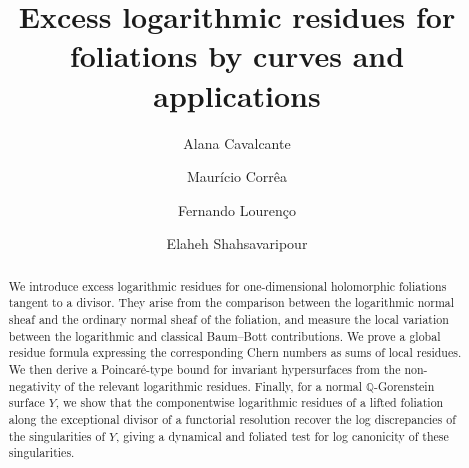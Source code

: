 \documentclass[12pt,reqno,a4paper]{amsart}
\date{}
\numberwithin{equation}{section}
\theoremstyle{plain}
\theoremstyle{definition}
\begin{document}
\title{Excess logarithmic residues for foliations by curves and applications}

\author[A. Cavalcante]{Alana Cavalcante}
\address[A. Cavalcante]{Departamento de Matem\'atica, Universidade Federal de Vi\c cosa, Av. P. H. Rolfs, s/n, Vi\c cosa, Brazil}

\author[M. Corr\^ea]{Maur\'icio Corr\^ea}
\address[M. Corr\^ea]{Dipartimento di Matematica, Universit\`a degli Studi di Bari, Via E. Orabona 4, I-70125 Bari, Italy}

\author[F. Louren\c co]{Fernando Louren\c co}
\address[F. Louren\c co]{DMM, Universidade Federal de Lavras, Campus Universit\'ario, Lavras, Brazil}

\author[E. Shahsavaripour]{Elaheh Shahsavaripour}
\address[E. Shahsavaripour]{Universit\`a degli Studi di Bari, Via E. Orabona 4, I-70125 Bari, Italy}



 \begin{abstract}
 We introduce excess logarithmic residues for one-dimensional holomorphic
foliations tangent to a divisor. They arise from the comparison between the
logarithmic normal sheaf and the ordinary normal sheaf of the foliation, and
measure the local variation between the logarithmic and classical Baum--Bott
contributions. We prove a global residue formula expressing the corresponding
Chern numbers as sums of local residues. We then derive a Poincar\'e-type bound
for invariant hypersurfaces from the non-negativity of the relevant logarithmic
residues. Finally, for a normal \(\mathbb Q\)-Gorenstein surface \(Y\), we show
that the componentwise logarithmic residues of a lifted foliation along the
exceptional divisor of a functorial resolution recover the log discrepancies of
the singularities of \(Y\), giving a dynamical and foliated test for log
canonicity of these singularities.
\end{abstract}

\maketitle
 
  
\end{document}
